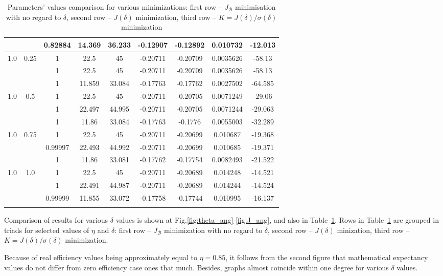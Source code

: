 \documentclass[%
master,         %
subf,           %
href,           %
colorlinks=true %
]{disser}
\numberwithin{equation}{section}
\numberwithin{figure}{section}
\begin{document}
\begin{longtable}{|c|c|c|c|c|c|c|c|c|}
 &  & 0.82884 & 14.369 & 36.233 & -0.12907 & -0.12892 & 0.010732 & -12.013\\\hline
\multirow{3}{*}{1.0} & \multirow{3}{*}{0.25} & 1 & 22.5 & 45 & -0.20711 & -0.20709 & 0.0035626 & -58.13\\\cline{3-9}
 &  & 1 & 22.5 & 45 & -0.20711 & -0.20709 & 0.0035626 & -58.13\\\cline{3-9}
 &  & 1 & 11.859 & 33.084 & -0.17763 & -0.17762 & 0.0027502 & -64.585\\\hline
\multirow{3}{*}{1.0} & \multirow{3}{*}{0.5} & 1 & 22.5 & 45 & -0.20711 & -0.20705 & 0.0071249 & -29.06\\\cline{3-9}
 &  & 1 & 22.497 & 44.995 & -0.20711 & -0.20705 & 0.0071244 & -29.063\\\cline{3-9}
 &  & 1 & 11.86 & 33.084 & -0.17763 & -0.1776 & 0.0055003 & -32.289\\\hline
\multirow{3}{*}{1.0} & \multirow{3}{*}{0.75} & 1 & 22.5 & 45 & -0.20711 & -0.20699 & 0.010687 & -19.368\\\cline{3-9}
 &  & 0.99997 & 22.493 & 44.992 & -0.20711 & -0.20699 & 0.010685 & -19.371\\\cline{3-9}
 &  & 1 & 11.86 & 33.081 & -0.17762 & -0.17754 & 0.0082493 & -21.522\\\hline
\multirow{3}{*}{1.0} & \multirow{3}{*}{1.0} & 1 & 22.5 & 45 & -0.20711 & -0.20689 & 0.014248 & -14.521\\\cline{3-9}
 &  & 1 & 22.491 & 44.987 & -0.20711 & -0.20689 & 0.014244 & -14.524\\\cline{3-9}
 &  & 0.99999 & 11.855 & 33.072 & -0.17758 & -0.17744 & 0.010995 & -16.137\\\hline
\caption{Parameters' values comparison for various minimizations: first row -- $J_\mathcal{B}$ 
minimisation with no regard to $\delta$, second row -- $J(\delta)$ minimization, third row -- 
$K = J(\delta) / \sigma(\delta)$ minimization}
 \label{tab:one_delta}
\end{longtable}
\endgroup

Comparison of results for various $\delta$ values is shown at Fig.\ref{fig:theta_ang}-\ref{fig:J_ang}, 
and also in Table~\ref{tab:one_delta}. Rows in Table~\ref{tab:one_delta} are grouped in triads for 
selected values of $\eta$ and $\delta$: first row --  $J_\mathcal{B}$ minimization with no regard to 
$\delta$, second row -- $J(\delta)$ minization, third row -- $K = J(\delta) / \sigma(\delta)$ minimization. 

Because of real efficiency values being approximately equal to $\eta = 0.85$, it follows from the second figure 
that mathematical expectancy values do not differ from zero efficiency case ones that much. Besides, 
graphs almost coincide within one degree for various $\delta$ values.
\end{document}
